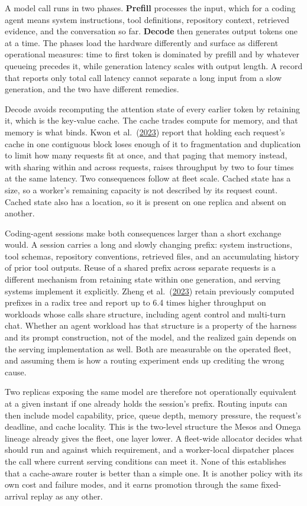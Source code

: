 A model call runs in two phases. \textbf{Prefill} processes the input, which for a coding agent means system instructions, tool definitions, repository context, retrieved evidence, and the conversation so far. \textbf{Decode} then generates output tokens one at a time. The phases load the hardware differently and surface as different operational measures: time to first token is dominated by prefill and by whatever queueing precedes it, while generation latency scales with output length. A record that reports only total call latency cannot separate a long input from a slow generation, and the two have different remedies.

Decode avoids recomputing the attention state of every earlier token by retaining it, which is the key-value cache. The cache trades compute for memory, and that memory is what binds. Kwon et al.~(\href{https://arxiv.org/abs/2309.06180}{2023}) report that holding each request's cache in one contiguous block loses enough of it to fragmentation and duplication to limit how many requests fit at once, and that paging that memory instead, with sharing within and across requests, raises throughput by two to four times at the same latency. Two consequences follow at fleet scale. Cached state has a size, so a worker's remaining capacity is not described by its request count. Cached state also has a location, so it is present on one replica and absent on another.

Coding-agent sessions make both consequences larger than a short exchange would. A session carries a long and slowly changing prefix: system instructions, tool schemas, repository conventions, retrieved files, and an accumulating history of prior tool outputs. Reuse of a shared prefix across separate requests is a different mechanism from retaining state within one generation, and serving systems implement it explicitly. Zheng et al.~(\href{https://arxiv.org/abs/2312.07104}{2023}) retain previously computed prefixes in a radix tree and report up to 6.4 times higher throughput on workloads whose calls share structure, including agent control and multi-turn chat. Whether an agent workload has that structure is a property of the harness and its prompt construction, not of the model, and the realized gain depends on the serving implementation as well. Both are measurable on the operated fleet, and assuming them is how a routing experiment ends up crediting the wrong cause.

Two replicas exposing the same model are therefore not operationally equivalent at a given instant if one already holds the session's prefix. Routing inputs can then include model capability, price, queue depth, memory pressure, the request's deadline, and cache locality. This is the two-level structure the Mesos and Omega lineage already gives the fleet, one layer lower. A fleet-wide allocator decides what should run and against which requirement, and a worker-local dispatcher places the call where current serving conditions can meet it. None of this establishes that a cache-aware router is better than a simple one. It is another policy with its own cost and failure modes, and it earns promotion through the same fixed-arrival replay as any other.

